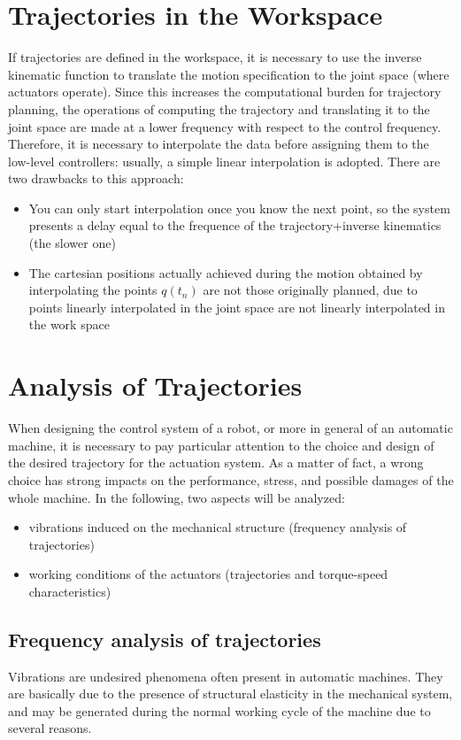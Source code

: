\documentclass{book}
\begin{document}
\section{Trajectories in the Workspace}
If trajectories are defined in the workspace, it is necessary to use the inverse kinematic function to translate the motion specification to the joint space (where actuators operate). Since this increases the computational burden for trajectory planning, the operations of computing the trajectory and translating it to the joint space are made at a lower frequency with respect to the control frequency. Therefore, it is necessary to interpolate the data before assigning them to the low-level controllers: usually, a simple linear interpolation is adopted.
There are two drawbacks to this approach: 
\begin{itemize}
    \item You can only start interpolation once you know the next point, so the system presents a delay equal to the frequence of the trajectory+inverse kinematics (the slower one) 
    \item The cartesian positions actually achieved during the motion obtained by interpolating the points $q(t_n)$ are not those originally planned, due to points linearly interpolated in the joint space are not linearly interpolated in the work space
\end{itemize}


\section{Analysis of Trajectories}
When designing the control system of a robot, or more in general of an automatic machine, it is necessary to pay particular attention to the choice and design of the desired trajectory for the actuation system. As a matter of fact, a wrong choice has strong impacts on the performance, stress, and possible damages of the whole machine. In the following, two aspects will be analyzed:\begin{itemize}
    \item vibrations induced on the mechanical structure (frequency analysis of trajectories)
    \item working conditions of the actuators (trajectories and torque-speed characteristics)
\end{itemize}

\subsection{Frequency analysis of trajectories}
Vibrations are undesired phenomena often present in automatic machines. They are basically due to the presence of structural elasticity in the mechanical system, and may be generated during the normal working cycle of the machine due to several reasons. 
\end{document}
